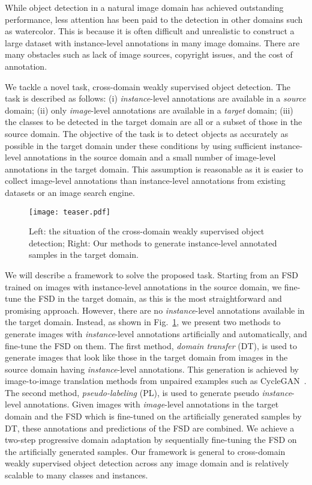 \documentclass[10pt,twocolumn,letterpaper]{article}
\newcommand{\Fref}[1]{Fig.~\ref{#1}}
\begin{document}
While object detection in a natural image domain has achieved outstanding performance, less attention has been paid to the detection in other domains such as watercolor.
This is because it is often difficult and unrealistic to construct a large dataset with instance-level annotations in many image domains.
There are many obstacles such as lack of image sources, copyright issues, and the cost of annotation.

We tackle a novel task, cross-domain weakly supervised object detection.
The task is described as follows: (i) \textit{instance}-level annotations are available in a \textit{source} domain; (ii) only \textit{image}-level annotations are available in a \textit{target} domain; (iii) the classes to be detected in the target domain are all or a subset of those in the source domain.
The objective of the task is to detect objects as accurately as possible in the target domain under these conditions by using sufficient instance-level annotations in the source domain and a small number of image-level annotations in the target domain.
This assumption is reasonable as it is easier to collect image-level annotations than instance-level annotations from existing datasets or an image search engine.

\begin{figure}[t]
	\centering
    \texttt{[image: teaser.pdf]}
    \caption{Left: the situation of the cross-domain weakly supervised object detection; Right: Our methods to generate instance-level annotated samples in the target domain.}
	\label{fig:teaser}
\end{figure}

We will describe a framework to solve the proposed task.
Starting from an FSD trained on images with instance-level annotations in the source domain, we fine-tune the FSD in the target domain, as this is the most straightforward and promising approach.
However, there are no \textit{instance}-level annotations available in the target domain.
Instead, as shown in \Fref{fig:teaser}, we present two methods to generate images with \textit{instance}-level annotations artificially and automatically, and fine-tune the FSD on them.
The first method, \textit{domain transfer} (DT), is used to generate images that look like those in the target domain from images in the source domain having \textit{instance}-level annotations.
This generation is achieved by image-to-image translation methods from unpaired examples such as CycleGAN~\cite{zhu2017unpaired}.
The second method, \textit{pseudo-labeling} (PL), is used to generate pseudo \textit{instance}-level annotations.
Given images with \textit{image}-level annotations in the target domain and the FSD which is fine-tuned on the artificially generated samples by DT, these annotations and predictions of the FSD are combined.
We achieve a two-step progressive domain adaptation by sequentially fine-tuning the FSD on the artificially generated samples.
Our framework is general to cross-domain weakly supervised object detection across any image domain and is relatively scalable to many classes and instances.
\end{document}
